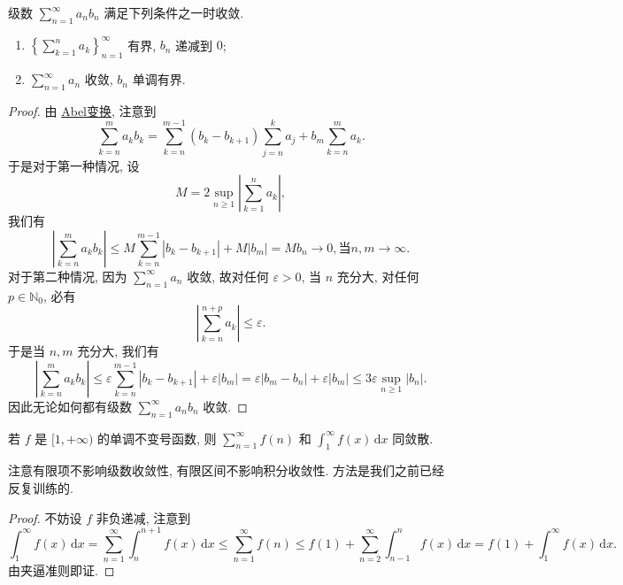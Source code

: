 \documentclass[../../main.tex]{subfiles}
\begin{document}
\begin{theorem}[A-D判别法]
级数 \( \sum_{n=1}^\infty a_n b_n \) 满足下列条件之一时收敛.
\begin{enumerate}
\item \( \left\{ \sum_{k=1}^n a_k \right\}_{n=1}^\infty \) 有界, \( b_n \) 递减到 \( 0 \);

\item \( \sum_{n=1}^\infty a_n \) 收敛, \( b_n \) 单调有界.
\end{enumerate}
\end{theorem}
\begin{proof}
由 \hyperref[theorem:Abel变换]{Abel变换}, 注意到
\[
\sum_{k=n}^m a_k b_k = \sum_{k=n}^{m - 1} (b_k - b_{k + 1}) \sum_{j=n}^k a_j + b_m \sum_{k=n}^m a_k.
\]
于是对于第一种情况, 设
\[
M = 2 \sup_{n \geqslant 1} \left| \sum_{k=1}^n a_k \right|,
\]
我们有
\[
\left| \sum_{k=n}^m a_k b_k \right| \leqslant M \sum_{k=n}^{m - 1} |b_k - b_{k + 1}| + M |b_m| = M b_n \to 0, \text{当} n, m \to \infty.
\]
对于第二种情况, 因为 \( \sum_{n=1}^\infty a_n \) 收敛, 故对任何 \( \varepsilon > 0 \), 当 \( n \) 充分大, 对任何 \( p \in \mathbb{N}_0 \), 必有
\[
\left| \sum_{k=n}^{n + p} a_k \right| \leqslant \varepsilon.
\]
于是当 \( n, m \) 充分大, 我们有
\[
\left| \sum_{k=n}^m a_k b_k \right| \leqslant \varepsilon \sum_{k=n}^{m - 1} |b_k - b_{k + 1}| + \varepsilon |b_m| = \varepsilon |b_m - b_n| + \varepsilon |b_m| \leqslant 3 \varepsilon \sup_{n \geqslant 1} |b_n|.
\]
因此无论如何都有级数 \( \sum_{n=1}^\infty a_n b_n \) 收敛.

\end{proof}

\begin{theorem}[积分判别法]\label{theorem:积分判别法}
若 \( f \) 是 \( [1, +\infty) \) 的单调不变号函数, 则 \( \sum_{n=1}^\infty f(n) \) 和 \( \int_1^\infty f(x) \, \mathrm{d}x \) 同敛散.
\end{theorem}
\begin{note}
注意有限项不影响级数收敛性, 有限区间不影响积分收敛性. 方法是我们之前已经反复训练的.
\end{note}
\begin{proof}
不妨设 \( f \) 非负递减, 注意到
\[
\int_1^\infty f(x) \, \mathrm{d}x = \sum_{n=1}^\infty \int_n^{n + 1} f(x) \, \mathrm{d}x \leqslant \sum_{n=1}^\infty f(n) \leqslant f(1) + \sum_{n=2}^\infty \int_{n - 1}^n f(x) \, \mathrm{d}x = f(1) + \int_1^\infty f(x) \, \mathrm{d}x.
\]
由夹逼准则即证.

\end{proof}
\end{document}
